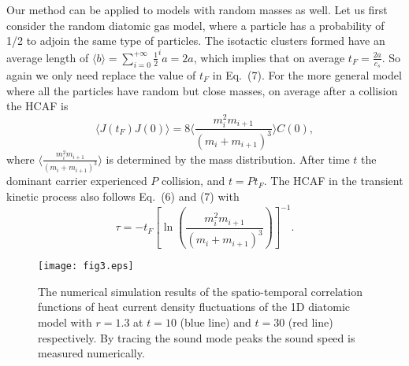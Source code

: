 \documentclass[twocolumn,secnumarabic,amssymb, nobibnotes, aps, pre,superscriptaddress]{revtex4}
\begin{document}
Our method can be applied to models with random masses as well. Let us first consider the random diatomic gas model, where a particle has a probability of 1/2 to adjoin the same type of particles. The isotactic clusters formed have an average length of $\langle b\rangle =\sum_{i=0}^{+\infty}\frac{1}{2}^ia=2a$, which implies that on average $t_F=\frac{2a}{c_s}$. So again we only need replace the value of $t_F$ in Eq.~(7). For the more general model where all the particles have random but close masses, on average after a collision the HCAF is
\begin{equation}
\langle J(t_F)J(0) \rangle =8\langle \frac {m_{i}^2m_{i+1}}{(m_{i}+m_{i+1})^3}\rangle C(0),
\end{equation}
where $\langle \frac {m_{i}^2m_{i+1}}{(m_{i}+m_{i+1})^3}\rangle$ is determined by the mass distribution. After time $t$ the dominant carrier experienced $P$ collision, and $t=P t_F$. The HCAF in the transient kinetic process also follows  Eq.~(6) and (7) with
\begin{equation}
\tau=-t_F[\ln(\frac{m_{i}^2m_{i+1}}{(m_{i}+m_{i+1})^3})]^{-1}.
\end{equation}

    \begin{figure}[!t]
    \centering
    \texttt{[image: fig3.eps]}
    \caption{The numerical simulation results of the spatio-temporal correlation functions of heat current density fluctuations of the 1D diatomic model with $r=1.3$ at $t=10$ (blue line) and $t=30$ (red line) respectively. By tracing the sound mode peaks the sound speed is measured numerically.  }
    \end{figure}
\end{document}

